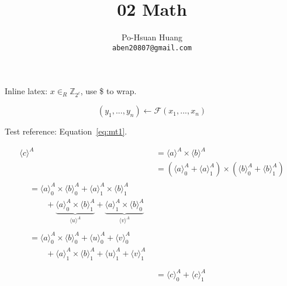 \documentclass[12pt, a4paper]{article}
\title{02 Math}
\author{Po-Hsuan Huang\\ 
    \texttt{aben20807@gmail.com}
}
\begin{document}
\maketitle

Inline latex: $x \in_R \mathbb{Z}_{2^\ell}$, use \$ to wrap.

$$
(y_1, ..., y_n) \gets \mathcal{F}(x_1, ..., x_n)
$$

Test reference: Equation~\ref{eq:mt1}.

\begin{align}
    \langle c\rangle^A & = \langle a\rangle^A \times \langle b \rangle^A \label{eq:mt1} \\
    & = (\langle a\rangle^A_0 + \langle a\rangle^A_1) \times (\langle b\rangle^A_0 + \langle b\rangle^A_1) \label{eq:mt2} \\
    \begin{split}
        & = \langle a\rangle^A_0 \times \langle b\rangle^A_0 + \langle a\rangle^A_1 \times \langle b\rangle^A_1 \\
        & \qquad + \underbrace{\langle a\rangle^A_0 \times \langle b\rangle^A_1}_{\langle u\rangle^A} + \underbrace{\langle a\rangle^A_1 \times \langle b\rangle^A_0}_{\langle v\rangle^A}
    \end{split} \label{eq:mt3} \\
    \begin{split}
        & = \langle a\rangle^A_0 \times \langle b\rangle^A_0 + \langle u\rangle^A_0 + \langle v\rangle^A_0\\
        & \qquad + \langle a\rangle^A_1 \times \langle b\rangle^A_1 + \langle u\rangle^A_1 + \langle v\rangle^A_1\\
    \end{split} \label{eq:mt4} \\
    & = \langle c\rangle^A_0 + \langle c\rangle^A_1 \label{eq:mt5}
\end{align}
\end{document}
